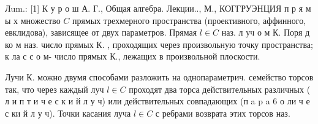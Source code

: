 \documentclass[10pt]{article}
\begin{document}
Лum.: [1] К у р о ш А. Г., Общая алгебра. Лекции.., М., КОГГРУЭНЦИЯ п р я м ы х множество $C$ прямых трехмерного пространства (проективного, аффинного, евклидова), зависящее от двух параметров. Прямая $l \in C$ наз. л уч о м К. Поря д ко м наз. число прямых $К$. , проходящих через произвольную точку пространства; к ла с с о м- число прямых К., лежащих в произвольной плоскости.



Лучи К. можно двумя способами разложить на однопараметрич. семейство торсов так, что через каждый луч $l \in C$ проходят два торса действительных различных ( л и п т и ч е с к и й л у ч) или действительных совпадающих (п a p a 6 о ли ч е с ки й л у ч). Точки касания луча $l \in C$ с ребрами возврата этих торсов наз.
\end{document}
